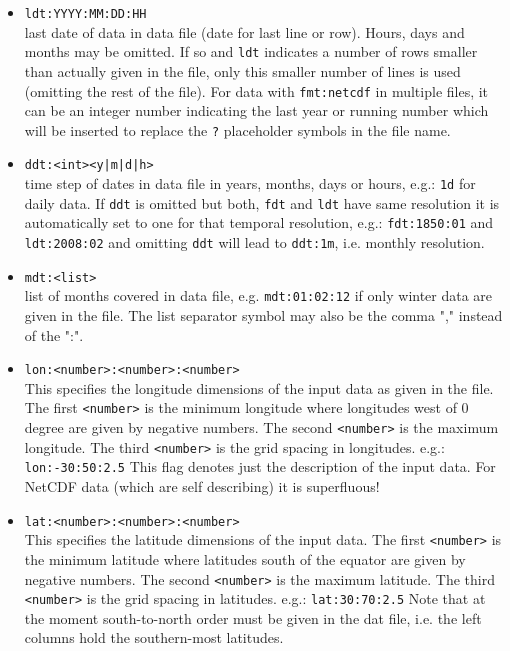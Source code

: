 \documentclass[12pt, oneside, a4paper, headsepline, plainheadsepline]{scrbook}
\begin{document}
\begin{itemize}
\item \verb+ldt:YYYY:MM:DD:HH+ \\
		last date of data in data file (date for last line or row). Hours, days and months may be omitted.
		If so and \verb+ldt+ indicates a number of rows smaller than actually given in the file, only this smaller
		number of lines is used (omitting the rest of the file). For data with \verb+fmt:netcdf+ in multiple
		files, it can be an integer number indicating the last year
		or running number which will be inserted to replace the \verb+?+ placeholder symbols in the file name.

\item \verb+ddt:<int><y|m|d|h>+ \\
		time step of dates in data file in years, months, days or hours, e.g.: \verb+1d+ for daily data. 
		If \verb+ddt+ is omitted but both, \verb+fdt+ and \verb+ldt+ have same resolution it is automatically
		 set to one for that temporal resolution, e.g.: \verb+fdt:1850:01+ and \verb+ldt:2008:02+ and omitting
		  \verb+ddt+ will lead to \verb+ddt:1m+, i.e. monthly resolution. 
		
\item \verb+mdt:<list>+ \\
		list of months covered in data file, e.g. \verb+mdt:01:02:12+ if only winter data are given in the file. The list separator symbol may also be the comma "," instead of the ":".

\item \verb+lon:<number>:<number>:<number>+ \\
        This specifies the longitude dimensions of the input
        data as given in the file. The first \verb+<number>+ is the minimum longitude where
        longitudes west of 0 degree are given by negative numbers.
        The second \verb+<number>+ is the maximum longitude. The third
        \verb+<number>+ is the grid spacing in longitudes. 
        e.g.: \verb+lon:-30:50:2.5+
        This flag denotes just the description of the input data.
        For NetCDF data (which are self describing) it is superfluous!

\item \verb+lat:<number>:<number>:<number>+ \\
        This specifies the latitude dimensions of the input
        data. The first \verb+<number>+ is the minimum latitude where
        latitudes south of the equator are given by negative numbers.
        The second \verb+<number>+ is the maximum latitude. The third
        \verb+<number>+ is the grid spacing in latitudes. 
        e.g.: \verb+lat:30:70:2.5+
		Note that at the moment south-to-north order must be given in the 
		dat file, i.e. the left columns hold the southern-most latitudes.

\end{itemize}
\end{document}
